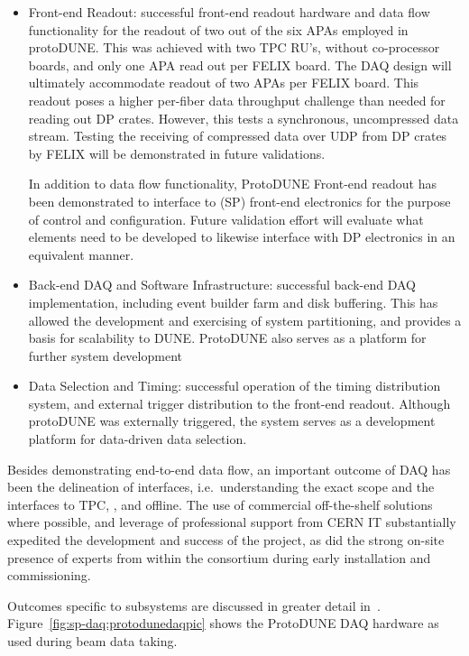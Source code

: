 \begin{itemize}
\item Front-end Readout: successful front-end readout hardware and data
  flow functionality for the readout of two out of the six APAs employed
  in protoDUNE.
  This was achieved with two TPC RU's, without co-processor boards, and
  only one APA read out per FELIX board.
  The  DAQ design will ultimately accommodate readout of two
  APAs per FELIX board.
  This readout poses a higher per-fiber data throughput challenge than
  needed for reading out DP crates. 
  However, this tests a synchronous, uncompressed data stream. 
  Testing the receiving of compressed data over UDP from DP crates by
  FELIX will be demonstrated in future validations.

  In addition to data flow functionality, ProtoDUNE Front-end readout
  has been demonstrated to interface to (SP) front-end electronics for
  the purpose of control and configuration. 
  Future validation effort will evaluate what elements need to be
  developed to likewise interface with DP electronics in an equivalent
  manner.

\item Back-end DAQ and Software Infrastructure: successful back-end
  DAQ implementation, including event builder farm and disk buffering.
  This has allowed the development and exercising of system
  partitioning, and provides a basis for scalability to DUNE.
  ProtoDUNE also serves as a platform for further system development

\item Data Selection and Timing: successful operation of the timing
  distribution system, and external trigger distribution to the
  front-end readout.
  Although protoDUNE was externally triggered, the system serves as a
  development platform for data-driven data selection.
\end{itemize}

Besides demonstrating end-to-end data flow, an important outcome of
 DAQ has been the delineation of interfaces, i.e.~understanding
the exact  scope and the interfaces to TPC, , and
offline.
The use of commercial off-the-shelf solutions where possible, and
leverage of professional support from CERN IT substantially expedited
the development and success of the project, as did the strong on-site
presence of experts from within the consortium during early installation
and commissioning. 

Outcomes specific to  subsystems are discussed in
greater detail
in~\cite{talkfromCDR}. Figure~\ref{fig:sp-daq:protodunedaqpic} shows the
ProtoDUNE DAQ hardware as used during beam data taking.


